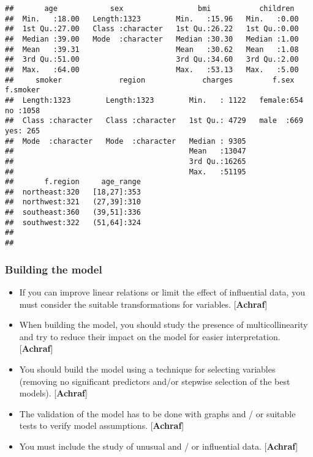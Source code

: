 \documentclass[
]{article}
\begin{document}
\begin{verbatim}
##       age            sex                 bmi           children   
##  Min.   :18.00   Length:1323        Min.   :15.96   Min.   :0.00  
##  1st Qu.:27.00   Class :character   1st Qu.:26.22   1st Qu.:0.00  
##  Median :39.00   Mode  :character   Median :30.30   Median :1.00  
##  Mean   :39.31                      Mean   :30.62   Mean   :1.08  
##  3rd Qu.:51.00                      3rd Qu.:34.60   3rd Qu.:2.00  
##  Max.   :64.00                      Max.   :53.13   Max.   :5.00  
##     smoker             region             charges         f.sex     f.smoker  
##  Length:1323        Length:1323        Min.   : 1122   female:654   no :1058  
##  Class :character   Class :character   1st Qu.: 4729   male  :669   yes: 265  
##  Mode  :character   Mode  :character   Median : 9305                          
##                                        Mean   :13047                          
##                                        3rd Qu.:16265                          
##                                        Max.   :51195                          
##       f.region     age_range  
##  northeast:320   [18,27]:353  
##  northwest:321   (27,39]:310  
##  southeast:360   (39,51]:336  
##  southwest:322   (51,64]:324  
##                               
## 
\end{verbatim}

\hypertarget{building-the-model}{%
\subsubsection{Building the model}\label{building-the-model}}

\begin{itemize}
\item
  If you can improve linear relations or limit the effect of influential
  data, you must consider the suitable transformations for variables.
  {[}\textbf{Achraf}{]}
\item
  When building the model, you should study the presence of
  multicollinearity and try to reduce their impact on the model for
  easier interpretation. {[}\textbf{Achraf}{]}
\item
  You should build the model using a technique for selecting variables
  (removing no significant predictors and/or stepwise selection of the
  best models). {[}\textbf{Achraf}{]}
\item
  The validation of the model has to be done with graphs and / or
  suitable tests to verify model assumptions. {[}\textbf{Achraf}{]}
\item
  You must include the study of unusual and / or influential data.
  {[}\textbf{Achraf}{]}
\end{itemize}
\end{document}
